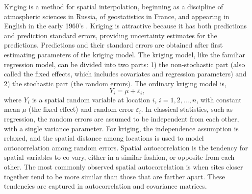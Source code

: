 \documentclass[11pt, titlepage]{article}\usepackage[]{graphicx}\usepackage[]{color}
\begin{document}
\begin{spacing}{1.9}
\begin{flushleft}
Kriging is a method for spatial interpolation, beginning as a discipline of atmospheric sciences in Russia, of geostatistics in France, and appearing in English in the early 1960's \citep{Gand:obje:1963, Math:Prin:1963,Cres:orig:1990}.  Kriging is attractive because it has both predictions and prediction standard errors, providing uncertainty estimates for the predictions. Predictions and their standard errors are obtained after first estimating parameters of the kriging model.  The kriging model, like the familiar regression model, can be divided into two parts: 1) the non-stochastic part (also called the fixed effects, which includes covariates and regression parameters) and 2) the stochastic part (the random errors).  The ordinary kriging model is,
\begin{equation} \label{eq:OKmodel}
    Y_i = \mu + \varepsilon_i,
\end{equation}
where $Y_i$ is a spatial random variable at location $i$, $i = 1,2,\ldots,n$, with constant mean $\mu$ (the fixed effect) and random error $ \varepsilon_i$. In classical statistics, such as regression, the random errors are assumed to be independent from each other, with a single variance parameter.  For kriging, the independence assumption is relaxed, and the spatial distance among locations is used to model autocorrelation among random errors. Spatial autocorrelation is the tendency for spatial variables to co-vary, either in a similar fashion, or opposite from each other.  The most commonly observed spatial autocorrelation is when sites closer together tend to be more similar than those that are farther apart.  These tendencies are captured in autocorrelation and covariance matrices. 


\end{flushleft}
\end{spacing}
\end{document}
